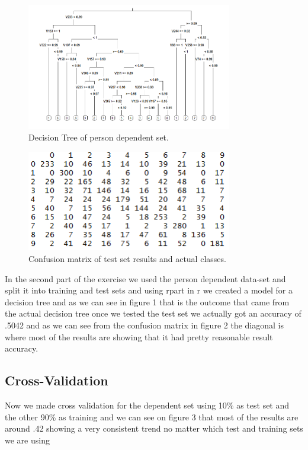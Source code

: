 \documentclass[paper=a4, fontsize=11pt]{scrartcl} %
\begin{document}
\begin{figure}[h]
	\centering
	\includegraphics[width=0.8\textwidth]{figures/decisionTree.png}
	\caption{Decision Tree of person dependent set.}
	\label{fig:scree}
\end{figure}

\begin{figure}[h]
	\centering
	\includegraphics[width=0.8\textwidth]{figures/confusionMatrix.PNG}
	\caption{Confusion matrix of test set results and actual classes.}
	\label{fig:scree}
\end{figure}


In the second part of the exercise we used the person dependent data-set and split it into training and test sets and using rpart in r we created a model for a decision tree and as we can see in figure 1 that is the outcome that came from the actual decision tree once we tested the test set we actually got an accuracy of .5042 and as we can see from the confusion matrix in figure 2 the diagonal is where most of the results are showing that it had pretty reasonable result accuracy.


\clearpage
\subsection{Cross-Validation}
Now we made cross validation for the dependent set using 10\% as test set and the other 90\% as training and we can see on figure 3 that most of the results are around .42 showing a very consistent trend no matter which test and training sets we are using
\end{document}
